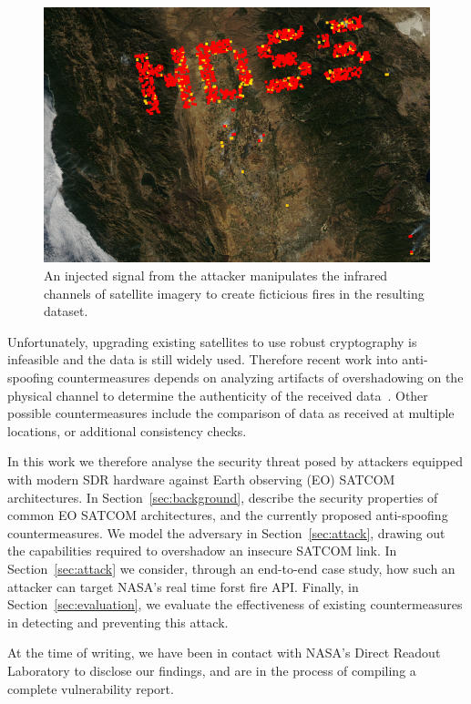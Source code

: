 \begin{figure}
    \includegraphics[width=\columnwidth]{diagrams/injection/pixels_800_140.jpg}
    \caption{An injected signal from the attacker manipulates the infrared channels of satellite imagery to create ficticious fires in the resulting dataset.}
    \label{fig:location-injection}
\end{figure}


Unfortunately, upgrading existing satellites to use robust cryptography is infeasible and the data is still widely used.
Therefore recent work into anti-spoofing countermeasures depends on analyzing artifacts of overshadowing on the physical channel to determine the authenticity of the received data~\cite{jedermann2021orbit,oligeri2020past}.
Other possible countermeasures include the comparison of data as received at multiple locations, or additional consistency checks.

In this work we therefore analyse the security threat posed by attackers equipped with modern SDR hardware against Earth observing (EO) SATCOM architectures.
In Section~\ref{sec:background}, describe the security properties of common EO SATCOM architectures, and the currently proposed anti-spoofing countermeasures.
We model the adversary in Section~\ref{sec:attack}, drawing out the capabilities required to overshadow an insecure SATCOM link.
In Section~\ref{sec:attack} we consider, through an end-to-end case study, how such an attacker can target NASA's real time forst fire API.
Finally, in Section~\ref{sec:evaluation}, we evaluate the effectiveness of existing countermeasures in detecting and preventing this attack.

At the time of writing, we have been in contact with NASA's Direct Readout Laboratory to disclose our findings, and are in the process of compiling a complete vulnerability report.
